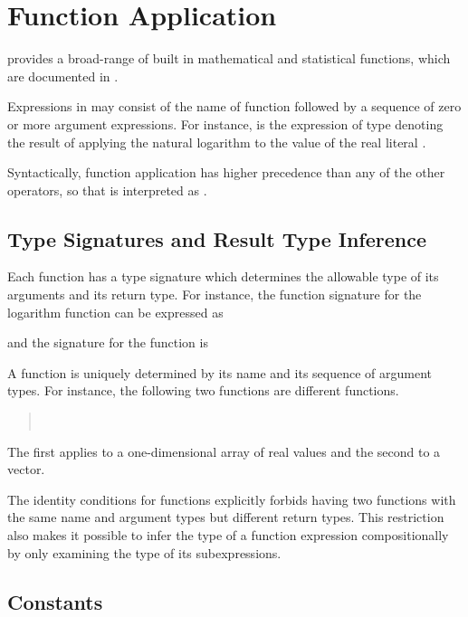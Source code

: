 \section{Function Application}

\Stan provides a broad-range of built in mathematical and statistical
functions, which are documented in .

Expressions in \Stan may consist of the name of function followed by a
sequence of zero or more argument expressions.  For instance,
 is the expression of type  denoting the
result of applying the natural logarithm to the value of the real
literal .

Syntactically, function application has higher precedence than any of
the other operators, so that  is interpreted as
.

\subsection{Type Signatures and Result Type Inference}

Each function has a type signature which determines the allowable type
of its arguments and its return type.  For instance, the function
signature for the logarithm function can be expressed as
%
\begin{quote}
\end{quote}
%
and the signature for the  function is
%
\begin{quote}
\end{quote}
%
A function is uniquely determined by its name and its sequence of
argument types.  For instance, the following two functions are
different functions.
%
\begin{quote}
\\
\end{quote}
%
The first applies to a one-dimensional array of real values and the
second to a vector.

The identity conditions for functions explicitly forbids having two
functions with the same name and argument types but different return
types.  This restriction also makes it possible to infer the type of a
function expression compositionally by only examining the type of its
subexpressions. 

\subsection{Constants}

